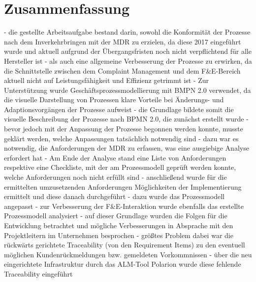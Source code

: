 \documentclass[a4paper,12pt]{report}
\begin{document}
\chapter{Zusammenfassung}\label{chap:Zusammenfassung}
- die gestellte Arbeitsaufgabe bestand darin, sowohl die Konformität der Prozesse nach dem Inverkehrbringen mit der MDR zu erzielen, da diese 2017 eingeführt wurde und aktuell aufgrund der Übergangsfristen noch nicht verpflichtend für alle Hersteller ist
- als auch eine allgemeine Verbesserung der Prozesse zu erwirken, da die Schnittstelle zwischen dem Complaint Management und dem F\&E-Bereich aktuell nicht auf Leistungsfähigkeit und Effizienz getrimmt ist
- Zur Unterstützung wurde Geschäftsprozessmodellierung mit BMPN 2.0 verwendet, da die visuelle Darstellung von Prozessen klare Vorteile bei Änderungs- und Adaptionsvorgängen der Prozesse aufweist
- die Grundlage bildete somit die visuelle Beschreibung der Prozesse nach BPMN 2.0, die zunächst erstellt wurde
- bevor jedoch mit der Anpassung der Prozesse begonnen werden konnte, musste geklärt werden, welche Anpassungen tatsächlich notwendig sind
- dazu war es notwendig, die Anforderungen der MDR zu erfassen, was eine ausgiebige Analyse erfordert hat
- Am Ende der Analyse stand eine Liste von Anforderungen respektive eine Checkliste, mit der am Prozessmodell geprüft werden konnte, welche Anforderungen noch nicht erfüllt sind
- anschließend wurde für die ermittelten umzusetzenden Anforderungen Möglichkeiten der Implementierung ermittelt und diese danach durchgeführt
- dazu wurde das Prozessmodell angepasst
- zur Verbesserung der F\&E-Interaktion wurde ebenfalls das erstellte Prozessmodell analysiert
- auf dieser Grundlage wurden die Folgen für die Entwicklung betrachtet und mögliche Verbesserungen in Absprache mit den Projektleitern im Unternehmen besprochen
- größtes Problem dabei war die rückwärts gerichtete Traceability (von den Requirement Items) zu den eventuell möglichen Kundenrückmeldungen bzw. gemeldeten Vorkommnissen
- über die neu eingerichtete Infrastruktur durch das ALM-Tool Polarion wurde diese fehlende Traceability eingeführt

\end{document}
